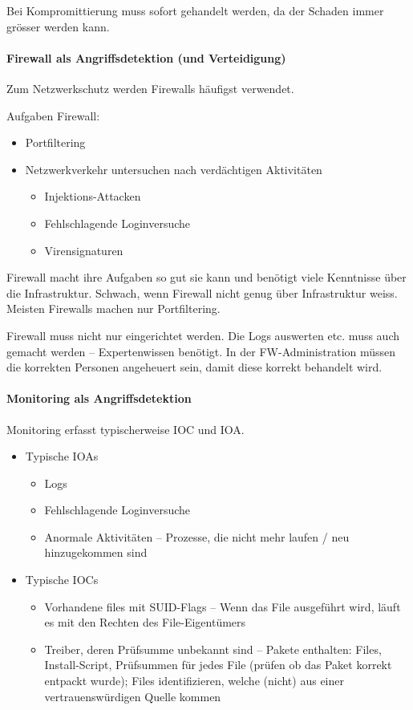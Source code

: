 \documentclass[a4paper,12pt]{article}
\begin{document}
Bei Kompromittierung muss sofort gehandelt werden, da der Schaden immer grösser werden kann.

\paragraph{Firewall als Angriffsdetektion (und Verteidigung)}
Zum Netzwerkschutz werden Firewalls häufigst verwendet.

Aufgaben Firewall:
\begin{itemize}
\item Portfiltering
\item Netzwerkverkehr untersuchen nach verdächtigen Aktivitäten
    \begin{itemize}
    \item Injektions-Attacken
    \item Fehlschlagende Loginversuche
    \item Virensignaturen
    \end{itemize}
\end{itemize}

Firewall macht ihre Aufgaben so gut sie kann und benötigt viele Kenntnisse über die Infrastruktur. Schwach, wenn Firewall nicht genug über Infrastruktur weiss. Meisten Firewalls machen nur Portfiltering.

Firewall muss nicht nur eingerichtet werden. Die Logs auswerten etc. muss auch gemacht werden -- Expertenwissen benötigt. In der FW-Administration müssen die korrekten Personen angeheuert sein, damit diese korrekt behandelt wird.

\paragraph{Monitoring als Angriffsdetektion}
Monitoring erfasst typischerweise IOC und IOA.

\begin{itemize}
\item Typische IOAs
    \begin{itemize}
    \item Logs
    \item Fehlschlagende Loginversuche
    \item Anormale Aktivitäten -- Prozesse, die nicht mehr laufen / neu hinzugekommen sind
    \end{itemize}
\item Typische IOCs
    \begin{itemize}
    \item Vorhandene files mit SUID-Flags -- Wenn das File ausgeführt wird, läuft es mit den Rechten des File-Eigentümers
    \item Treiber, deren Prüfsumme unbekannt sind -- Pakete enthalten: Files, Install-Script, Prüfsummen für jedes File (prüfen ob das Paket korrekt entpackt wurde); Files identifizieren, welche (nicht) aus einer vertrauenswürdigen Quelle kommen
    \end{itemize}
\end{itemize}
\end{document}
